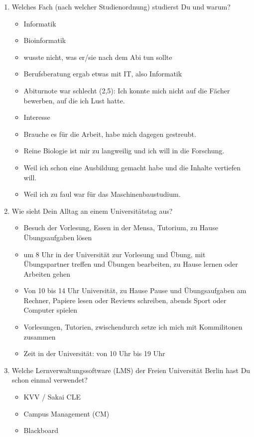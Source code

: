\documentclass{article}
\begin{document}
\begin{enumerate}
\item Welches Fach (nach welcher Studienordnung) studierst Du und warum?
\begin{itemize}
\item Informatik
\item Bioinformatik
\item wusste nicht, was er/sie nach dem Abi tun sollte
\item Berufsberatung ergab etwas mit IT, also Informatik
\item Abiturnote war schlecht (2,5): Ich konnte mich nicht auf die Fächer bewerben, auf die ich Lust hatte.
\item Interesse
\item Brauche es für die Arbeit, habe mich dagegen gestreubt.
\item Reine Biologie ist mir zu langweilig und ich will in die Forschung.
\item Weil ich schon eine Ausbildung gemacht habe und die Inhalte vertiefen will.
\item Weil ich zu faul war für das Maschinenbaustudium.
\end{itemize}

\item Wie sieht Dein Alltag an einem Universitätstag aus?
\begin{itemize}
\item Besuch der Vorlesung, Essen in der Mensa, Tutorium, zu Hause Übungsaufgaben lösen
\item um 8 Uhr in der Universität zur Vorlesung und Übung, mit Übungspartner treffen und Übungen bearbeiten, zu Hause lernen oder Arbeiten gehen
\item Von 10 bis 14 Uhr Universität, zu Hause Pause und Übungsaufgaben am Rechner, Papiere lesen oder Reviews schreiben, abends Sport oder Computer spielen
\item Vorlesungen, Tutorien, zwischendurch setze ich mich mit Kommilitonen zusammen
\item Zeit in der Universität: von 10 Uhr bis 19 Uhr
\end{itemize}

\item Welche Lernverwaltungssoftware (LMS) der Freien Universität Berlin hast Du schon einmal verwendet?
\begin{itemize}
\item KVV / Sakai CLE
\item Campus Management (CM)
\item Blackboard
\end{itemize}


\end{enumerate}
\end{document}
